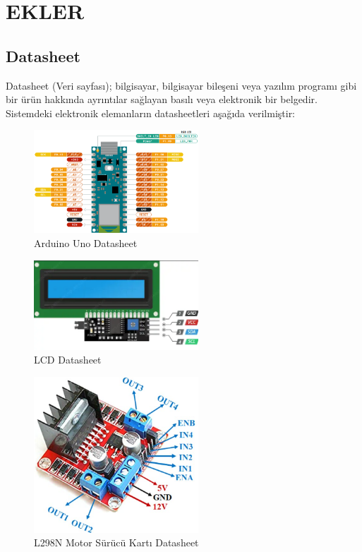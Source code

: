 \section{EKLER}
\centering\subsection{Datasheet}
    Datasheet (Veri sayfası); bilgisayar, bilgisayar bileşeni veya yazılım programı gibi bir ürün hakkında ayrıntılar sağlayan basılı veya elektronik bir belgedir. Sistemdeki elektronik elemanların datasheetleri aşağıda verilmiştir:
    
\begin{figure}[H]
\centering
\includegraphics[width=0.55\textwidth]{Resimler/11.png}
\caption{Arduino Uno Datasheet}
\label{fig:11}
\end{figure}

\begin{figure}[H]
\centering
\includegraphics[width=0.55\textwidth]{Resimler/19.png}
\caption{LCD Datasheet}
\label{fig:19}
\end{figure}

\begin{figure}[H]
\centering
\includegraphics[width=0.55\textwidth]{Resimler/13.png}
\caption{L298N Motor Sürücü Kartı Datasheet}
\label{fig:13}
\end{figure}

